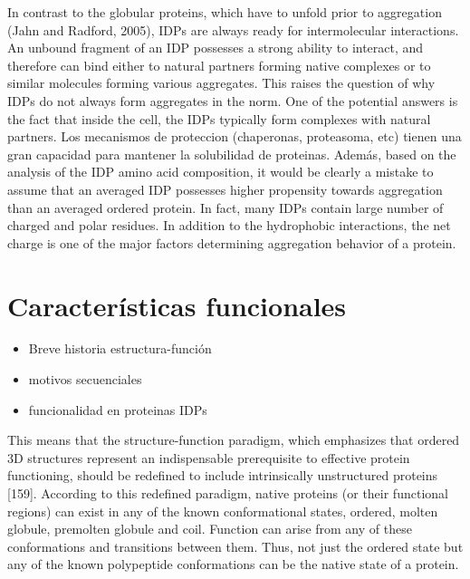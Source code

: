 In contrast to the globular proteins, which have to unfold prior to aggregation (Jahn and Radford, 2005), IDPs are always ready for intermolecular interactions. 
An unbound fragment of an IDP possesses a strong ability to interact, and therefore can bind either to natural partners forming native complexes or to similar molecules forming various aggregates. 
This raises the question of why IDPs do not always form aggregates in the norm. One of the potential answers is the fact that inside the cell, the IDPs typically form complexes with natural partners.
Los mecanismos de proteccion (chaperonas, proteasoma, etc) tienen una gran capacidad para mantener la solubilidad de proteinas.
Además, based on the analysis of the IDP amino acid composition, it would be clearly a mistake to assume that an averaged IDP possesses higher propensity towards aggregation than an averaged ordered
protein. In fact, many IDPs contain large number of charged and polar residues. In addition to the hydrophobic interactions, the net charge is one of the major factors determining aggregation behavior of a protein.













\section{Características funcionales}
\begin{itemize}
 \item Breve historia estructura-función
 \item motivos secuenciales
 \item funcionalidad en proteinas IDPs
\end{itemize}


This means that the structure-function paradigm, which emphasizes that ordered 3D structures represent an indispensable prerequisite to effective protein functioning, should be redefined to include intrinsically unstructured proteins [159]. According to this redefined paradigm, native proteins (or their functional regions) can exist in any of the known conformational states, ordered, molten globule, premolten globule and coil. Function can arise from any of these conformations
and transitions between them. Thus, not just the ordered state but any of the known polypeptide conformations can be the native state of a protein.




